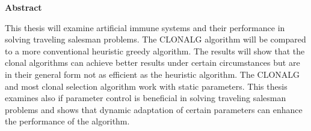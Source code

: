 %
%
% 
% 
% 



\cleardoublepage


\begin{center}
{\Large\bfseries Abstract}
\end{center}
This thesis will examine artificial immune systems and their performance in solving traveling salesman problems. The CLONALG algorithm will be compared to a more conventional heuristic greedy algorithm. The results will show that the clonal algorithms can achieve better results under certain circumstances but are in their general form not as efficient as the heuristic algorithm. The CLONALG and most clonal selection algorithm work with static parameters. This thesis examines also if parameter control is beneficial in solving traveling salesman problems and shows that dynamic adaptation of certain parameters can enhance the performance of the algorithm. 


